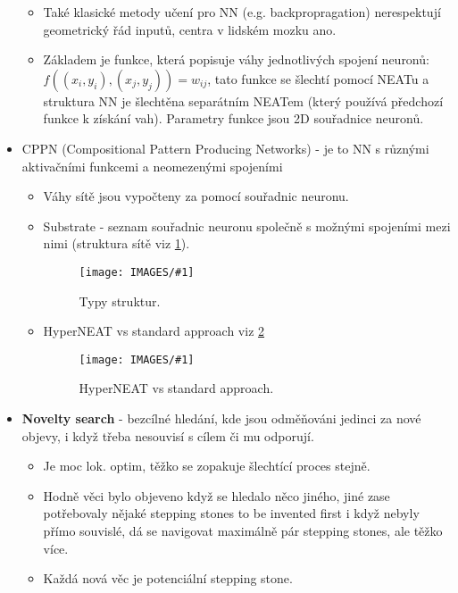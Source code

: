 \documentclass[a4paper,hidelinks]{article}
\newcommand{\myimagebig}[1] {\texttt{[image: IMAGES/\#1]}}
\begin{document}
\begin{itemize}
        \begin{itemize}
            \item Také klasické metody učení pro NN (e.g. backpropragation) nerespektují geometrický řád inputů, centra v lidském mozku ano.
            \item Základem je funkce, která popisuje váhy jednotlivých spojení neuronů: $f((x_i,y_i),(x_j,y_j))=w_{ij}$, tato funkce se šlechtí pomocí NEATu a struktura NN je šlechtěna separátním NEATem (který používá předchozí funkce k získání vah). Parametry funkce jsou 2D souřadnice neuronů.
        \end{itemize}
    \item CPPN (Compositional Pattern Producing Networks) - je to NN s různými aktivačními funkcemi a neomezenými spojeními
        \begin{itemize}
            \item Váhy sítě jsou vypočteny za pomocí souřadnic neuronu.
            \item Substrate - seznam souřadnic neuronu společně s možnými spojeními mezi nimi (struktura sítě viz \ref{fig:mvi_3_struktura}).
            \begin{figure}[h]\centering
                \myimagebig{mvi_3_10}
                \caption{Typy struktur.}\label{fig:mvi_3_struktura}
            \end{figure}
            \item HyperNEAT vs standard approach viz \ref{fig:mvi_3_hyper_vs_sd}
            \begin{figure}[h]\centering
                \myimagebig{mvi_3_11}
                \caption{HyperNEAT vs standard approach.}\label{fig:mvi_3_hyper_vs_sd}
            \end{figure}
        \end{itemize}
    \item \textbf{Novelty search} - bezcílné hledání, kde jsou odměňováni jedinci za nové objevy, i když třeba nesouvisí s cílem či mu odporují.
        \begin{itemize}
            \item Je moc lok. optim, těžko se zopakuje šlechtící proces stejně.
            \item Hodně věci bylo objeveno když se hledalo něco jiného, jiné zase potřebovaly nějaké stepping stones to be invented first i když nebyly přímo souvislé, dá se navigovat maximálně pár stepping stones, ale těžko více.
            \item Každá nová věc je potenciální stepping stone.
        \end{itemize}
\end{itemize}
\end{document}
